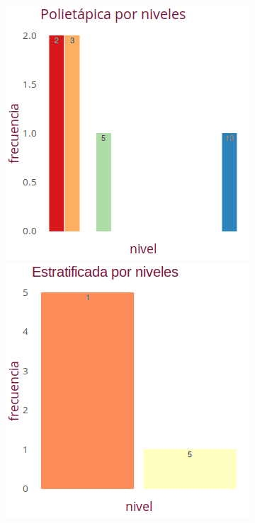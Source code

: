 \documentclass[10,a4paperpaper,]{article}
\begin{document}
\newpage

\begin{figure}[!htb]
  \begin{minipage}{0.3\textwidth}
    \centering
    \includegraphics[width=1.1\linewidth]{figures/poliEtapa.png}
  \end{minipage}\hfill
  \begin{minipage}{0.3\textwidth}
    \centering
    \includegraphics[width=1.1\linewidth]{figures/estratif.png}

\end{minipage}
\end{figure}
\end{document}
